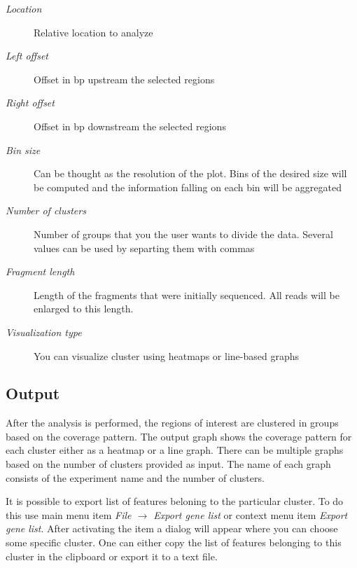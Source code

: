\documentclass[a4paper,10pt,english]{sphinxmanual}
\begin{document}
\begin{description}
\begin{itemize}
\end{itemize}

\item[{\emph{Location}}] \leavevmode
Relative location to analyze

\item[{\emph{Left offset}}] \leavevmode
Offset in bp upstream the selected regions

\item[{\emph{Right offset}}] \leavevmode
Offset in bp downstream the selected regions

\item[{\emph{Bin size}}] \leavevmode
Can be thought as the resolution of the plot. Bins of the desired size will be computed and the information falling on each bin will be aggregated

\item[{\emph{Number of clusters}}] \leavevmode
Number of groups that you the user wants to divide the data. Several values can be used by separting them with commas

\item[{\emph{Fragment length}}] \leavevmode
Length of the fragments that were initially sequenced. All reads will be enlarged to this length.

\item[{\emph{Visualization type}}] \leavevmode
You can visualize cluster using heatmaps or line-based graphs

\end{description}


\subsection{Output}
\label{analysis:id7}
After the analysis is performed, the regions of interest are clustered in groups based on the coverage pattern. The output graph shows the coverage pattern for each cluster either as a heatmap or a line graph. There can be multiple graphs based on the number of clusters provided as input. The name of each graph consists of the experiment name and the number of clusters.

It is possible to export list of features beloning to the particular cluster. To do this use main menu item \emph{File \(\rightarrow\) Export gene list} or context menu item \emph{Export gene list}. After activating the item a dialog will appear where you can choose some specific cluster. One can either copy the list of features belonging to this cluster in the clipboard or export it to a text file.
\end{document}
